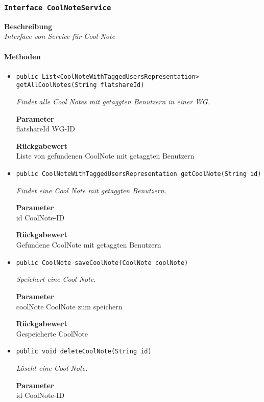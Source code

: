     \subsubsection{\texttt{Interface CoolNoteService}}
    \textbf{Beschreibung} \\
    \textit{Interface von Service für Cool Note}
    \paragraph*{Methoden}
    \begin{itemize}
    	\item{\texttt{public List<CoolNoteWithTaggedUsersRepresentation> getAllCoolNotes(String flatshareId)}}
    	
    	\textit{Findet alle Cool Notes mit getaggten Benutzern in einer WG.}
    	
    	\textbf{Parameter} \\
    	flatshareId WG-ID
    	
    	\textbf{Rückgabewert} \\
    	Liste von gefundenen CoolNote mit getaggten Benutzern        \item{\texttt{public CoolNoteWithTaggedUsersRepresentation getCoolNote(String id)}}
    	
    	\textit{Findet eine Cool Note mit getaggten Benutzern.}
    	
    	\textbf{Parameter} \\
    	id CoolNote-ID
    	
    	\textbf{Rückgabewert} \\
    	Gefundene CoolNote mit getaggten Benutzern        \item{\texttt{public CoolNote saveCoolNote(CoolNote coolNote)}}
    	
    	\textit{Speichert eine Cool Note.}
    	
    	\textbf{Parameter} \\
    	coolNote CoolNote zum speichern
    	
    	\textbf{Rückgabewert} \\
    	Gespeicherte CoolNote        \item{\texttt{public void deleteCoolNote(String id)}}
    	
    	\textit{Löscht eine Cool Note.}
    	
    	\textbf{Parameter} \\
    	id CoolNote-ID
    	
    	
    \end{itemize}

